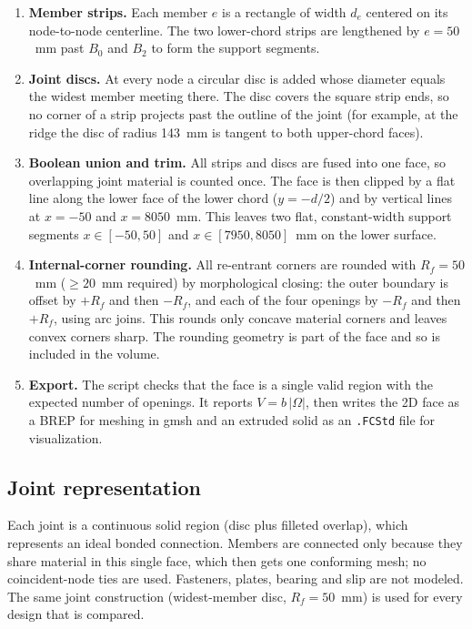 \begin{enumerate}
  \item \textbf{Member strips.} Each member $e$ is a rectangle of width
  $d_e$ centered on its node-to-node centerline. The two lower-chord
  strips are lengthened by $e=50$~mm past $B_0$ and $B_2$ to form the
  support segments.
  \item \textbf{Joint discs.} At every node a circular disc is added
  whose diameter equals the widest member meeting there. The disc covers
  the square strip ends, so no corner of a strip projects past the outline
  of the joint (for example, at the ridge the disc of radius 143~mm is
  tangent to both upper-chord faces).
  \item \textbf{Boolean union and trim.} All strips and discs are fused
  into one face, so overlapping joint material is counted once. The face
  is then clipped by a flat line along the lower face of the lower chord
  ($y=-d/2$) and by vertical lines at $x=-50$ and $x=8050$~mm. This leaves
  two flat, constant-width support segments
  $x\in[-50,50]$ and $x\in[7950,8050]$~mm on the lower surface.
  \item \textbf{Internal-corner rounding.} All re-entrant corners are
  rounded with $R_f=50$~mm ($\geq20$~mm required) by morphological
  closing: the outer boundary is offset by $+R_f$ and then $-R_f$, and
  each of the four openings by $-R_f$ and then $+R_f$, using arc joins.
  This rounds only concave material corners and leaves convex corners
  sharp. The rounding geometry is part of the face and so is included in
  the volume.
  \item \textbf{Export.} The script checks that the face is a single valid
  region with the expected number of openings. It reports
  $V=b\,|\Omega|$, then writes the 2D face as a BREP for meshing in gmsh
  and an extruded solid as an \texttt{.FCStd} file for visualization.
\end{enumerate}

\subsection{Joint representation}
Each joint is a continuous solid region (disc plus filleted overlap),
which represents an ideal bonded connection. Members are connected only
because they share material in this single face, which then gets one
conforming mesh; no coincident-node ties are used. Fasteners, plates,
bearing and slip are not modeled. The same joint construction
(widest-member disc, $R_f=50$~mm) is used for every design that is
compared.

